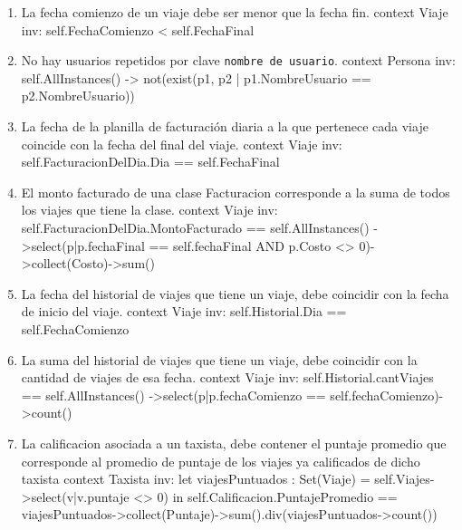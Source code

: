 \begin{enumerate}
	\item \begin{ocl}{La fecha comienzo de un viaje debe ser menor que la fecha fin.}
		  context Viaje
		  inv: self.FechaComienzo < self.FechaFinal
		\end{ocl}

	\item \begin{ocl}{No hay usuarios repetidos por clave \texttt{nombre de usuario}.}
		  context Persona
		  inv: self.AllInstances() -> not(exist(p1, p2 | p1.NombreUsuario == p2.NombreUsuario))
		\end{ocl}	

	\item \begin{ocl}{La fecha de la planilla de facturaci\'on diaria a la que pertenece cada viaje coincide con la fecha del final del viaje.}
		  context Viaje
		  inv: self.FacturacionDelDia.Dia == self.FechaFinal
		\end{ocl}

	\item \begin{ocl}{El monto facturado de una clase Facturacion corresponde a la suma de todos los viajes que tiene la clase.}
		  context Viaje
		  inv: self.FacturacionDelDia.MontoFacturado == self.AllInstances()
		  ->select(p|p.fechaFinal == self.fechaFinal AND p.Costo <> 0)->collect(Costo)->sum()
		\end{ocl}
		

	\item \begin{ocl}{La fecha del historial de viajes que tiene un viaje, debe coincidir con la fecha de inicio del viaje.}
		  context Viaje
		  inv: self.Historial.Dia == self.FechaComienzo
		\end{ocl}

			\item \begin{ocl}{La suma del historial de viajes que tiene un viaje, debe coincidir con la cantidad de viajes de esa fecha.}
		  context Viaje
		  inv: self.Historial.cantViajes == self.AllInstances()
		  ->select(p|p.fechaComienzo == self.fechaComienzo)->count()
		\end{ocl}


	\item \begin{ocl}{La calificacion asociada a un taxista, debe contener el puntaje promedio que corresponde al promedio de puntaje de los viajes ya calificados de dicho taxista}
		  context Taxista
		  inv: let viajesPuntuados : Set(Viaje) = self.Viajes->select(v|v.puntaje <> 0) in
		  self.Calificacion.PuntajePromedio == 
		  viajesPuntuados->collect(Puntaje)->sum().div(viajesPuntuados->count())
		\end{ocl}
		

\end{enumerate}
